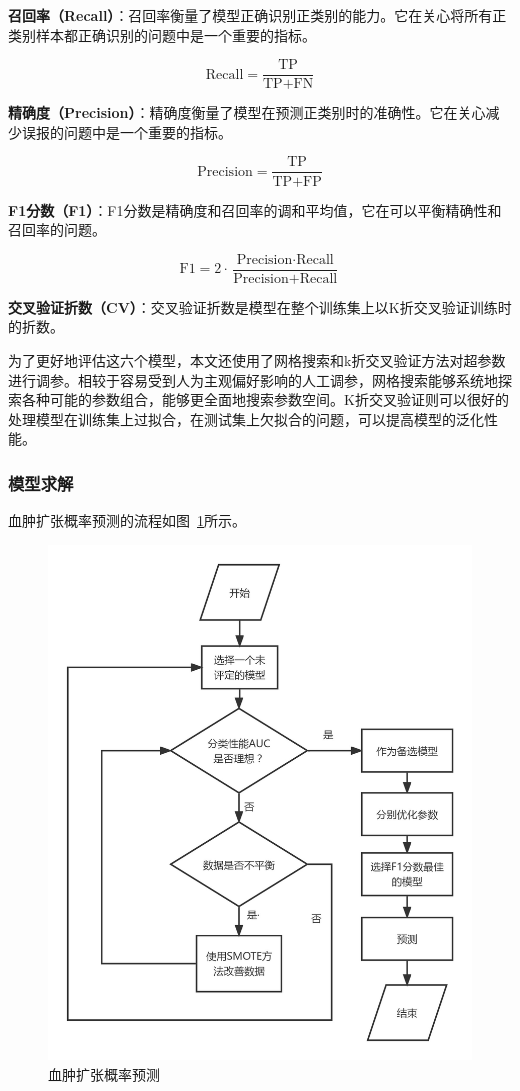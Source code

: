 \documentclass[bwprint]{gmcmthesis}
\begin{document}
\textbf{召回率（Recall）}：召回率衡量了模型正确识别正类别的能力。它在关心将所有正类别样本都正确识别的问题中是一个重要的指标。

\begin{equation}
\text{Recall} = \frac{\text{TP}}{\text{TP} + \text{FN}}
\end{equation}

\textbf{精确度（Precision）}：精确度衡量了模型在预测正类别时的准确性。它在关心减少误报的问题中是一个重要的指标。

\begin{equation}
\text{Precision} = \frac{\text{TP}}{\text{TP} + \text{FP}}
\end{equation}

\textbf{F1分数（F1）}：F1分数是精确度和召回率的调和平均值，它在可以平衡精确性和召回率的问题。

\begin{equation}
\text{F1} = 2 \cdot \frac{\text{Precision} \cdot \text{Recall}}{\text{Precision} + \text{Recall}}
\end{equation}

\textbf{交叉验证折数（CV）}：交叉验证折数是模型在整个训练集上以K折交叉验证训练时的折数。

为了更好地评估这六个模型，本文还使用了网格搜索\cite{arslan2016different}和k折交叉验证方法\cite{colak2015application}对超参数进行调参。相较于容易受到人为主观偏好影响的人工调参，网格搜索能够系统地探索各种可能的参数组合，能够更全面地搜索参数空间。K折交叉验证则可以很好的处理模型在训练集上过拟合，在测试集上欠拟合的问题，可以提高模型的泛化性能。

\subsubsection{模型求解}

血肿扩张概率预测的流程如图~\ref{血肿扩张概率预测}所示。

\begin{figure}[!h]
\centering
\includegraphics[width=.7\textwidth]{figures/问题1_1流程图.jpg}
\caption{血肿扩张概率预测}
\label{血肿扩张概率预测}
\end{figure}
\end{document}
